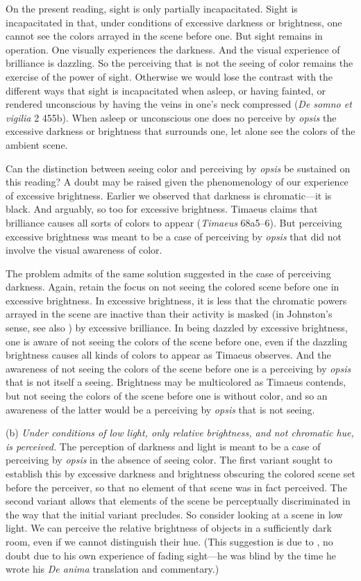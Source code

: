On the present reading, sight is only partially incapacitated. Sight is incapacitated in that, under conditions of excessive darkness or brightness, one cannot see the colors arrayed in the scene before one. But sight remains in operation. One visually experiences the darkness. And the visual experience of brilliance is dazzling. So the perceiving that is not the seeing of color remains the exercise of the power of sight. Otherwise we would lose the contrast with the different ways that sight is incapacitated when asleep, or having fainted, or rendered unconscious by having the veins in one's neck compressed (\emph{De somno et vigilia} 2 455b). When asleep or unconscious one does no perceive by \emph{opsis} the excessive darkness or brightness that surrounds one, let alone see the colors of the ambient scene.

Can the distinction between seeing color and perceiving by \emph{opsis} be sustained on this reading? A doubt may be raised given the phenomenology of our experience of excessive brightness. Earlier we observed that darkness is chromatic—it is black. And arguably, so too for excessive brightness. Timaeus claims that brilliance causes all sorts of colors to appear (\emph{Timaeus} 68a5–6). But perceiving excessive brightness was meant to be a case of perceiving by \emph{opsis} that did not involve the visual awareness of color.

The problem admits of the same solution suggested in the case of perceiving darkness. Again, retain the focus on not seeing the colored scene before one in excessive brightness. In excessive brightness, it is less that the chromatic powers arrayed in the scene are inactive than their activity is masked (in Johnston's \citeyear{Johnston:1992ck} sense, see also \citealt{Bird:1998aa}) by excessive brilliance. In being dazzled by excessive brightness, one is aware of not seeing the colors of the scene before one, even if the dazzling brightness causes all kinds of colors to appear as Timaeus observes. And the awareness of not seeing the colors of the scene before one is a perceiving by \emph{opsis} that is not itself a seeing. Brightness may be multicolored as Timaeus contends, but not seeing the colors of the scene before one is without color, and so an awareness of the latter would be a perceiving by \emph{opsis} that is not seeing.

(b) \emph{Under conditions of low light, only relative brightness, and not chromatic hue, is perceived.} The perception of darkness and light is meant to be a case of perceiving by \emph{opsis} in the absence of seeing color. The first variant sought to establish this by excessive darkness and brightness obscuring the colored scene set before the perceiver, so that no element of that scene was in fact perceived. The second variant allows that elements of the scene be perceptually discriminated in the way that the initial variant precludes. So consider looking at a scene in low light. We can perceive the relative brightness of objects in a sufficiently dark room, even if we cannot distinguish their hue. (This suggestion is due to \citealt[436]{Hicks:1907uq}, no doubt due to his own experience of fading sight—he was blind by the time he wrote his \emph{De anima} translation and commentary.) 

